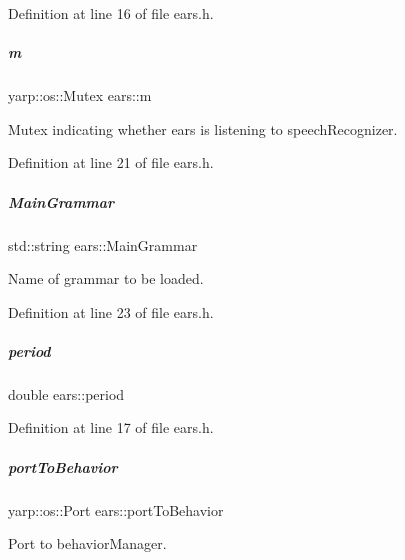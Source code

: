 Definition at line 16 of file ears.\+h.

\mbox{\label{group__ears_a76979363a7e9407fda301db649b52b25}} 
\subparagraph{\texorpdfstring{m}{m}}
{\footnotesize\ttfamily yarp\+::os\+::\+Mutex ears\+::m\hspace{0.3cm}{\ttfamily [protected]}}



Mutex indicating whether ears is listening to speech\+Recognizer. 



Definition at line 21 of file ears.\+h.

\mbox{\label{group__ears_adffc2dd061350aa8acbe6f52f4ab8feb}} 
\subparagraph{\texorpdfstring{Main\+Grammar}{MainGrammar}}
{\footnotesize\ttfamily std\+::string ears\+::\+Main\+Grammar\hspace{0.3cm}{\ttfamily [protected]}}



Name of grammar to be loaded. 



Definition at line 23 of file ears.\+h.

\mbox{\label{group__ears_a8894096259495df7094cf23907e4b506}} 
\subparagraph{\texorpdfstring{period}{period}}
{\footnotesize\ttfamily double ears\+::period\hspace{0.3cm}{\ttfamily [protected]}}



Definition at line 17 of file ears.\+h.

\mbox{\label{group__ears_a75f98651fc0d3b34a0bbb57d24d4e3e9}} 
\subparagraph{\texorpdfstring{port\+To\+Behavior}{portToBehavior}}
{\footnotesize\ttfamily yarp\+::os\+::\+Port ears\+::port\+To\+Behavior\hspace{0.3cm}{\ttfamily [protected]}}



Port to behavior\+Manager. 



